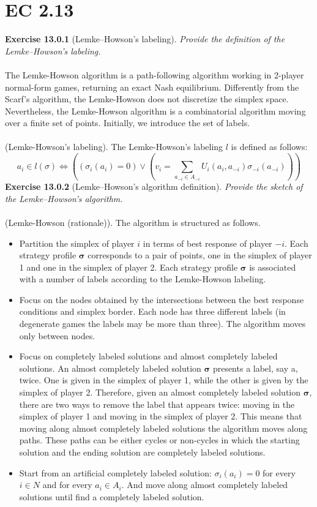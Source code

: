 \section{EC 2.13}

\textbf{Exercise 13.0.1} (Lemke–Howson’s labeling). \textit{Provide the definition of the Lemke–Howson’s labeling.}\\\\
The Lemke-Howson algorithm is a path-following algorithm working in 2-player normal-form games, returning an exact Nash equilibrium. Differently from the Scarf’s algorithm, the Lemke-Howson does not discretize the simplex space. Nevertheless, the Lemke-Howson algorithm is a combinatorial algorithm moving over a finite set
of points. Initially, we introduce the set of labels.\\\\
(Lemke-Howson's labeling). The Lemke-Howson's labeling $l$ is defined as follows:
$$
a_{i} \in l(\sigma) \Longleftrightarrow\left(\left(\sigma_{i}\left(a_{i}\right)=0\right) \vee\left(v_{i}=\sum_{a_{-i} \in A_{-i}} U_{i}\left(a_{i}, a_{-i}\right) \sigma_{-i}\left(a_{-i}\right)\right)\right)
$$
\textbf{Exercise 13.0.2} (Lemke–Howson’s algorithm definition). \textit{Provide the sketch of the Lemke–Howson’s algorithm.}\\\\
(Lemke-Howson (rationale)). The algorithm is structured as follows.
\begin{itemize}
\item Partition the simplex of player $i$ in terms of best response of player $-i$. Each strategy profile $\mathbf{\sigma}$ corresponds
to a pair of points, one in the simplex of player 1 and one in the simplex of player 2. Each strategy profile $\mathbf{\sigma}$ is associated with a number of labels according to the Lemke-Howson labeling.
\item Focus on the nodes obtained by the intersections between the best response conditions and simplex border. Each node has three different labels (in degenerate games the labels may be more than three). The algorithm moves only between nodes.
\item Focus on completely labeled solutions and almost completely labeled solutions. An almost completely labeled solution $\mathbf{\sigma}$ presents a label, say a, twice. One is given in the simplex of player 1, while the other is given by the simplex of player 2. Therefore, given an almost completely labeled solution $\mathbf{\sigma}$, there are two ways to remove the label that appears twice: moving in the simplex of player 1 and moving in the
simplex of player 2. This means that moving along almost completely labeled solutions the algorithm moves along paths. These paths can be either cycles or non-cycles in which the starting solution and
the ending solution are completely labeled solutions.
\item Start from an artificial completely labeled solution: $\sigma_i (a_i) = 0$ for every $i \in N$ and for every $a_i \in A_i$.
And move along almost completely labeled solutions until find a completely labeled solution.
\end{itemize}

